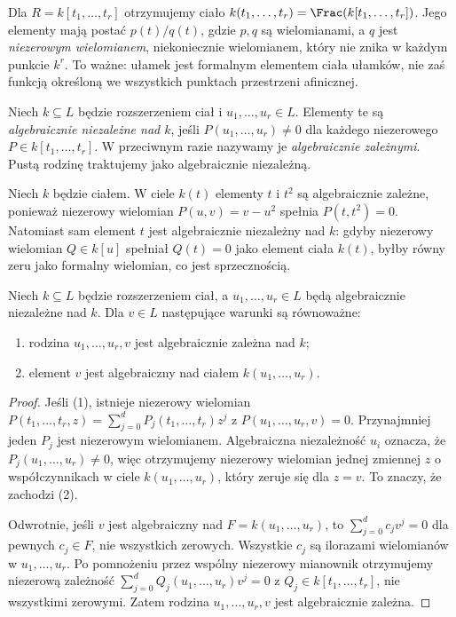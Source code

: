 \begin{uwaga}
Dla $R=k[t_1,\dots,t_r]$ otrzymujemy ciało
$k(t_1,\dots,t_r)=\Frac(k[t_1,\dots,t_r])$.
Jego elementy mają postać $p(t)/q(t)$, gdzie $p,q$ są
wielomianami, a $q$ jest \emph{niezerowym wielomianem},
niekoniecznie wielomianem, który nie znika w każdym punkcie $k^r$.
To ważne: ułamek jest formalnym elementem ciała ułamków,
nie zaś funkcją określoną we wszystkich punktach przestrzeni afinicznej.
\end{uwaga}

\begin{definicja}
Niech $k\subseteq L$ będzie rozszerzeniem ciał i
$u_1,\dots,u_r\in L$. Elementy te są
\emph{algebraicznie niezależne nad $k$}, jeśli
$P(u_1,\dots,u_r)\ne0$ dla każdego niezerowego
$P\in k[t_1,\dots,t_r]$. W przeciwnym razie
nazywamy je \emph{algebraicznie zależnymi}.
Pustą rodzinę traktujemy jako algebraicznie niezależną.
\end{definicja}

\begin{przyklad}
Niech $k$ będzie ciałem. W ciele $k(t)$ elementy $t$ i $t^2$ są algebraicznie zależne,
ponieważ niezerowy wielomian $P(u,v)=v-u^2$ spełnia
$P(t,t^2)=0$. Natomiast sam element $t$ jest algebraicznie
niezależny nad $k$: gdyby niezerowy wielomian $Q\in k[u]$
spełniał $Q(t)=0$ jako element ciała $k(t)$,
byłby równy zeru jako formalny wielomian, co jest sprzecznością.
\end{przyklad}

\begin{lemat}
\label{lem:independence-algebraic}
Niech $k\subseteq L$ będzie rozszerzeniem ciał,
a $u_1,\dots,u_r\in L$ będą algebraicznie niezależne nad $k$.
Dla $v\in L$ następujące warunki są równoważne:
\begin{enumerate}[label=\arabic*)]
\item rodzina $u_1,\dots,u_r,v$ jest algebraicznie zależna nad $k$;
\item element $v$ jest algebraiczny nad ciałem $k(u_1,\dots,u_r)$.
\end{enumerate}
\end{lemat}
\begin{proof}
Jeśli (1), istnieje niezerowy wielomian
$P(t_1,\dots,t_r,z)=\sum_{j=0}^d P_j(t_1,\dots,t_r)z^j$
z $P(u_1,\dots,u_r,v)=0$.
Przynajmniej jeden $P_j$ jest niezerowym wielomianem.
Algebraiczna niezależność $u_i$ oznacza, że
$P_j(u_1,\dots,u_r)\ne0$, więc otrzymujemy
niezerowy wielomian jednej zmiennej $z$ o współczynnikach
w ciele $k(u_1,\dots,u_r)$, który zeruje się dla $z=v$.
To znaczy, że zachodzi (2).

Odwrotnie, jeśli $v$ jest algebraiczny nad
$F=k(u_1,\dots,u_r)$, to
$\sum_{j=0}^d c_j v^j=0$ dla pewnych $c_j\in F$,
nie wszystkich zerowych. Wszystkie $c_j$ są ilorazami
wielomianów w $u_1,\dots,u_r$. Po pomnożeniu przez wspólny
niezerowy mianownik otrzymujemy niezerową zależność
$\sum_{j=0}^d Q_j(u_1,\dots,u_r)v^j=0$
z $Q_j\in k[t_1,\dots,t_r]$, nie wszystkimi zerowymi.
Zatem rodzina $u_1,\dots,u_r,v$ jest algebraicznie zależna.
\end{proof}


